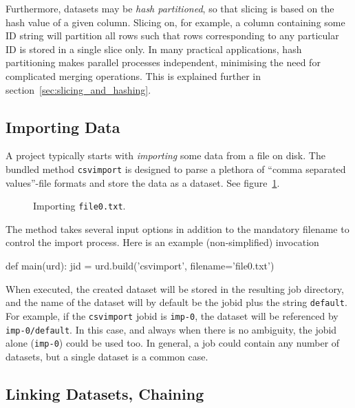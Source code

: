 Furthermore, datasets may be \textsl{hash partitioned}, so that
slicing is based on the hash value of a given column.  Slicing on, for
example, a column containing some ID string will partition all rows
such that rows corresponding to any particular ID is stored in a
single slice only.  In many practical applications, hash partitioning
makes parallel processes independent, minimising the need for
complicated merging operations.  This is explained further in
section~\ref{sec:slicing_and_hashing}.



\subsection{Importing Data}

A project typically starts with \textsl{importing} some data from a
file on disk.  The bundled method \texttt{csvimport} is designed to
parse a plethora of ``comma separated values''-file formats and store
the data as a dataset.  See figure~\ref{fig:dataset_csvimport}.
\begin{figure}[h!]
  \begin{center}
    
    \caption{Importing \texttt{file0.txt}.}
    \label{fig:dataset_csvimport}
  \end{center}
\end{figure}
The method takes several input options in addition to the mandatory
filename to control the import process.  Here is an example
(non-simplified) invocation
\begin{python}
def main(urd):
    jid = urd.build('csvimport', filename='file0.txt')
\end{python}
When executed, the created dataset will be stored in the resulting job
directory, and the name of the dataset will by default be the jobid
plus the string \texttt{default}.  For example, if the
\texttt{csvimport} jobid is \texttt{imp-0}, the dataset will be
referenced by \texttt{imp-0/default}.  In this case, and always when
there is no ambiguity, the jobid alone (\texttt{imp-0}) could be used
too.  In general, a job could contain any number of datasets, but a
single dataset is a common case.




\subsection{Linking Datasets, Chaining}

